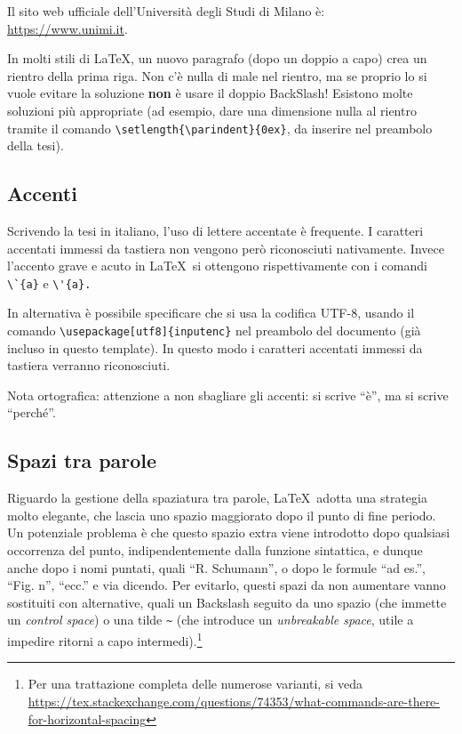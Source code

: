 \documentclass[12pt]{report}
\begin{document}
Il sito web ufficiale dell'Università degli Studi di Milano è:\\
\url{https://www.unimi.it}.

In molti stili di \LaTeX, un nuovo paragrafo (dopo un doppio a capo) crea un rientro della prima riga. Non c'\`e nulla di male nel rientro, ma se proprio lo si vuole evitare la soluzione \textbf{non} \`e usare il doppio BackSlash! Esistono molte soluzioni pi\`u appropriate (ad esempio, dare una dimensione nulla al rientro tramite il comando \verb|\setlength{\parindent}{0ex}|, da inserire nel preambolo della tesi).

\subsection{Accenti}

Scrivendo la tesi in italiano, l'uso di lettere accentate \`e frequente. I caratteri accentati immessi da tastiera non vengono per\`o riconosciuti nativamente. Invece l'accento grave e acuto in \LaTeX\ si ottengono rispettivamente con i comandi \verb|\`{a}| e \verb|\'{a}.|

In alternativa \`e possibile specificare che si usa la codifica UTF-8, usando il comando \verb|\usepackage[utf8]{inputenc}| nel preambolo del documento (già incluso in questo template). In questo modo i caratteri accentati immessi da tastiera verranno riconosciuti.

Nota ortografica: attenzione a non sbagliare gli accenti: si scrive ``\`e'', ma si scrive ``perch\'e''.

\subsection{Spazi tra parole}

Riguardo la gestione della spaziatura tra parole, \LaTeX\ adotta una strategia molto elegante, che lascia uno spazio maggiorato dopo il punto di fine periodo. Un potenziale problema è che questo spazio extra viene introdotto dopo qualsiasi occorrenza del punto, indipendentemente dalla funzione sintattica, e dunque anche dopo i nomi puntati, quali ``R. Schumann'', o dopo le formule ``ad es.'', ``Fig. n'', ``ecc.'' e via dicendo. Per evitarlo, questi spazi da non aumentare vanno sostituiti con alternative, quali un Backslash seguito da uno spazio (che immette un \textit{control space}) o una tilde \verb|~| (che introduce un \textit{unbreakable space}, utile a impedire ritorni a capo intermedi).\footnote{Per una trattazione completa delle numerose varianti, si veda \url{https://tex.stackexchange.com/questions/74353/what-commands-are-there-for-horizontal-spacing}}
\end{document}
